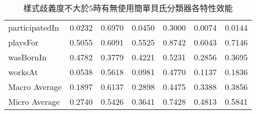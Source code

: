 \begin{table}[htbp]
\begin{tabular}{|l||c|c|c||c|c|c|}
participatedIn & 0.0232 & 0.6970 & 0.0450 & 0.3000 & 0.0074 & 0.0144 \\
playsFor & 0.5055 & 0.6091 & 0.5525 & 0.8742 & 0.6043 & 0.7146 \\
wasBornIn & 0.4782 & 0.3779 & 0.4221 & 0.5231 & 0.2856 & 0.3695 \\
worksAt & 0.0538 & 0.5618 & 0.0981 & 0.4770 & 0.1137 & 0.1836 \\
\hline
Macro Average & 0.1897 & 0.6137 & 0.2898 & 0.4475 & 0.3388 & 0.3856 \\
Micro Average & 0.2740 & 0.5426 & 0.3641 & 0.7428 & 0.4813 & 0.5841 \\
\hline
\end{tabular}
\caption{樣式歧義度不大於5時有無使用簡單貝氏分類器各特性效能}
\label{t:nbc}
\end{table}

